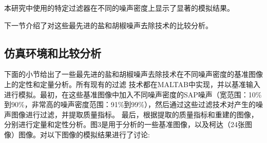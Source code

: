 \documentclass[12pt]{article} %
\begin{document}
本研究中使用的特定过滤器在不同的噪声密度上显示了显著的模拟结果。

下一节介绍了对这些最先进的盐和胡椒噪声去除技术的比较分析。

\subsection{仿真环境和比较分析}
下面的小节给出了一些最先进的盐和胡椒噪声去除技术在不同噪声密度的基准图像上的定性和定量分析。所有现有的过滤
技术都在MALTAB中实现，并以基准输入进行模拟。最初，在这些基准图像中加入不同噪声密度的SAP噪声（宽范围：10\%
到90\%，非常高的噪声密度范围：91\%到99\%），然后通过这些过滤技术对产生的噪声图像进行过滤，并提取质量指标。
最后，根据提取的质量指标和重建的图像，分别进行定量和定性分析。图3是用于分析的一些基准图像，以及柯达（24张图
像）图像。对以下图像的模拟结果进行了讨论:
\end{document}

